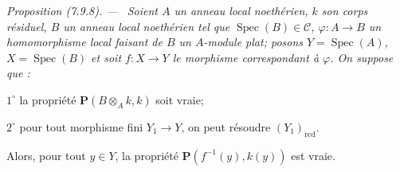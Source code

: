 \documentclass[10pt,oneside]{book}
\newenvironment{proposition}[1][]{%
  \par\medskip\noindent\itshape Proposition (#1). ---\ }{\par}
\begin{document}
\begin{proposition}[7.9.8]
\label{IV.2.s7.9.8-fr}
Soient $A$ un anneau local noethérien, $k$ son corps résiduel, $B$ un anneau
local noethérien tel que $\operatorname{Spec}(B)\in\mathcal C$,
$\varphi:A\to B$ un homomorphisme local faisant de $B$ un $A$-module plat;
posons $Y=\operatorname{Spec}(A)$, $X=\operatorname{Spec}(B)$ et soit
$f:X\to Y$ le morphisme correspondant à $\varphi$. On suppose que :

$1^\circ$ la propriété $\boldsymbol P(B\otimes_A k,k)$ soit vraie;

$2^\circ$ pour tout morphisme fini $Y_1\to Y$, on peut résoudre
$(Y_1)_{\mathrm{red}}$.

Alors, pour tout $y\in Y$, la propriété
$\boldsymbol P(f^{-1}(y),k(y))$ est vraie.
\end{proposition}
\end{document}
